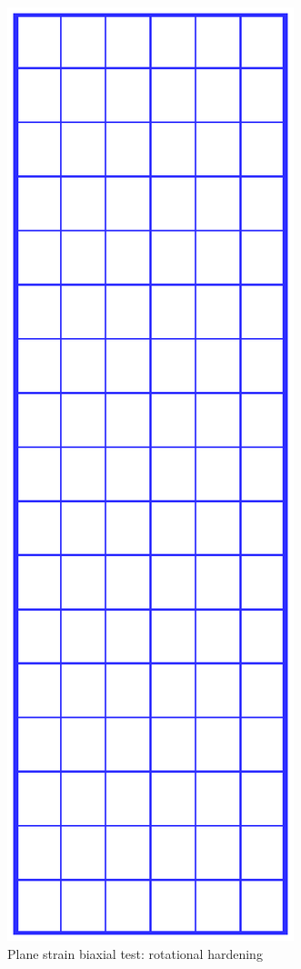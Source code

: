 \begin{figure}[H]
\center
\includegraphics[scale=0.3]{M/ssy_mesh.eps}
\caption{Plane strain biaxial test: rotational hardening}
 \label{fig:ssy}
\end{figure}


